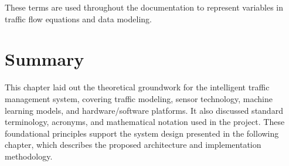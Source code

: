 These terms are used throughout the documentation to represent variables in traffic flow equations and data modeling.


\section*{Summary}

This chapter laid out the theoretical groundwork for the intelligent traffic management system, covering traffic modeling, sensor technology, machine learning models, and hardware/software platforms. It also discussed standard terminology, acronyms, and mathematical notation used in the project. These foundational principles support the system design presented in the following chapter, which describes the proposed architecture and implementation methodology.